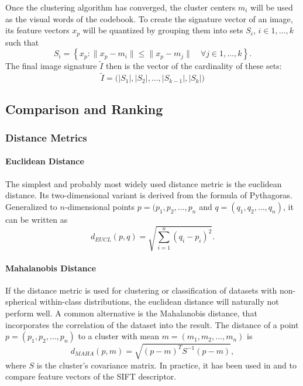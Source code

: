 Once the clustering algorithm has converged, the cluster centers $m_i$ will be
used as the visual words of the codebook. To create the signature vector of an
image, its feature vectors $x_p$ will be quantized by grouping them into sets
$S_i$, $i \in 1, \dots, k$ such that
\begin{equation*}
    S_i = \left\{ x_p : \| x_p - m_{i} \| \leq \| x_p - m_{j} \| \quad \forall j \in 1, \dots, k \right\}.
\end{equation*}
The final image signature $\tilde{I}$ then is the vector of the cardinality of these sets:
\begin{equation*}
    \tilde{I} = \big( |S_1|, |S_2|, \dots, |S_{k-1}|, |S_{k}| \big)
\end{equation*}

\subsection{Comparison and Ranking}\label{sec:anatomy_ranking}

\subsubsection{Distance Metrics}

\paragraph{Euclidean Distance}

The simplest and probably most widely used distance metric is the euclidean
distance. Its two-dimensional variant is derived from the formula of
Pythagoras. Generalized to $n$-dimensional points $p = (p_1, p_2, \dots, p_n$
and $q = (q_1, q_2, \dots, q_n)$, it can be written as
\begin{equation*}
    d_{EUCL}(p, q) = \sqrt{\sum_{i=1}^n (q_i - p_i)^2}.
\end{equation*}

\paragraph{Mahalanobis Distance}

If the distance metric is used for clustering or classification of datasets
with non-spherical within-class distributions, the euclidean distance will
naturally not perform well. A common alternative is the Mahalanobis distance,
that incorporates the correlation of the dataset into the result. The distance
of a point $p = (p_1, p_2, \dots, p_n)$ to a cluster with mean $m = (m_1, m_2,
\dots, m_n)$ is
\begin{equation*}
    d_{MAHA}(p, m) = \sqrt{(p - m)^T S^{-1} (p - m)},
\end{equation*}
where $S$ is the cluster's covariance matrix. In practice, it has been used in
\autocite{mikolajczyk_scale_2004} and \autocite{sivic_video_2003} to compare
feature vectors of the SIFT \autocite{lowe_object_1999} descriptor.


